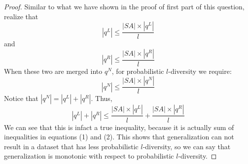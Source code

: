 \documentclass[12pt,reqno]{amsart}
\begin{document}
\begin{itemize}[label=]
\begin{proof}
Similar to what we have shown in the proof of first part of this question, realize that
\begin{equation}
|q^L| \leq \frac{|SA|\times|q^L|}{l}
\end{equation}
and
\begin{equation}
|q^R| \leq \frac{|SA|\times|q^R|}{l}
\end{equation}
When these two are merged into $q^N$, for probabilistic $l$-diversity we require:
$$
|q^N| \leq \frac{|SA|\times|q^N|}{l}
$$
Notice that $|q^N| = |q^L| + |q^R|$. Thus,
$$
|q^L| + |q^R| \leq \frac{|SA|\times|q^L|}{l} + \frac{|SA|\times|q^R|}{l}
$$
We can see that this is infact a true inequality, because it is actually sum of inequalities in equations (1) and (2). This shows that generalization can not result in a dataset that has less probabilistic $l$-diversity, so we can say that generalization is monotonic with respect to probabilistic $l$-diversity.
\end{proof}
\end{itemize}
\end{document}
